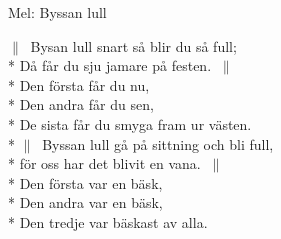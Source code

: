 \begin{SongText}
    \begin{SongInfo}
        Mel: Byssan lull
    \end{SongInfo}
    \begin{SongVerse}
        $\|\:$ Bysan lull snart så blir du så full;\\*%
        Då får du sju jamare på festen. $\:\|$\\*%
        Den första får du nu,\\*%
        Den andra får du sen,\\*%
        De sista får du smyga fram ur västen.\\*%
        $\|\:$ Byssan lull gå på sittning och bli full,\\*%
        för oss har det blivit en vana. $\:\|$\\*%
        Den första var en bäsk,\\*%
        Den andra var en bäsk,\\*%
        Den tredje var bäskast av alla.
    \end{SongVerse}
\end{SongText}
